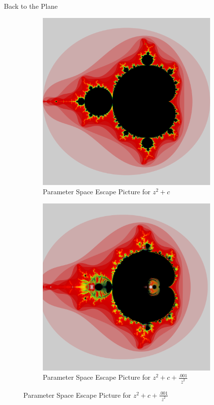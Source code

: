 \documentclass{beamer}
\newcommand{\<}{\left\langle}
\renewcommand{\>}{\right\rangle} %
\renewcommand{\*}{\cdot} %
\begin{document}
\begin{frame}{Back to the Plane}
	\begin{figure}[h]
	\centering
	\begin{subfigure}[b]{0.49\textwidth}
			\includegraphics[width=\textwidth]{./img/b000}
			\caption{Parameter Space Escape Picture for $z^2 + c$}
	\end{subfigure}%
	\begin{subfigure}[b]{0.49\textwidth}
			\includegraphics[width=\textwidth]{./img/b001}
			\caption{Parameter Space Escape Picture for $z^2 + c + \frac{.001}{\overline{z}^2}$}
	\end{subfigure}
\end{figure}
\end{frame}
\end{document}

